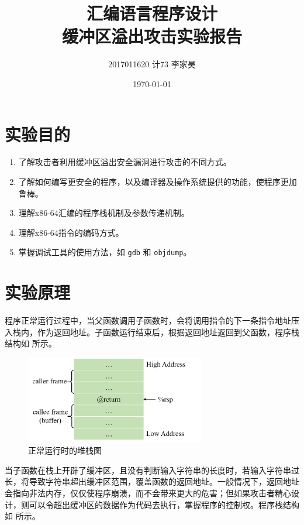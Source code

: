 \documentclass[12pt,a4paper]{article}
\title{汇编语言程序设计\\缓冲区溢出攻击实验报告}
\author{2017011620 计73 李家昊}
\date{\today}
\begin{document}

\maketitle

\section{实验目的}
\begin{enumerate}[1.]
    \item 了解攻击者利用缓冲区溢出安全漏洞进行攻击的不同方式。
    \item 了解如何编写更安全的程序，以及编译器及操作系统提供的功能，使程序更加鲁棒。
    \item 理解x86-64汇编的程序栈机制及参数传递机制。
    \item 理解x86-64指令的编码方式。
    \item 掌握调试工具的使用方法，如 \verb|gdb| 和 \verb|objdump|。
\end{enumerate}

\section{实验原理}

程序正常运行过程中，当父函数调用子函数时，会将调用指令的下一条指令地址压入栈内，作为返回地址。子函数运行结束后，根据返回地址返回到父函数，程序栈结构如  所示。

\begin{figure}[H]
    \hspace*{70pt}
    \includegraphics[width=0.7\textwidth]{./fig/normal.png}
    \caption{正常运行时的堆栈图}
    \label{figure:normal}
\end{figure}

当子函数在栈上开辟了缓冲区，且没有判断输入字符串的长度时，若输入字符串过长，将导致字符串超出缓冲区范围，覆盖函数的返回地址。一般情况下，返回地址会指向非法内存，仅仅使程序崩溃，而不会带来更大的危害；但如果攻击者精心设计，则可以令超出缓冲区的数据作为代码去执行，掌握程序的控制权。程序栈结构如  所示。
\end{document}
